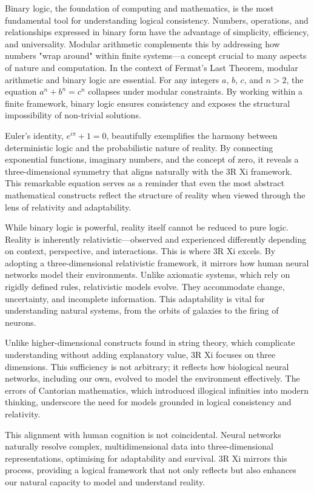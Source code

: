 \documentclass[12pt]{article}
\begin{document}
Binary logic, the foundation of computing and mathematics, is the most fundamental tool for understanding logical consistency. Numbers, operations, and relationships expressed in binary form have the advantage of simplicity, efficiency, and universality. Modular arithmetic complements this by addressing how numbers "wrap around" within finite systems—a concept crucial to many aspects of nature and computation. In the context of Fermat’s Last Theorem, modular arithmetic and binary logic are essential. For any integers \(a\), \(b\), \(c\), and \(n > 2\), the equation \(a^n + b^n = c^n\) collapses under modular constraints. By working within a finite framework, binary logic ensures consistency and exposes the structural impossibility of non-trivial solutions.

Euler’s identity, \(e^{i\pi} + 1 = 0\), beautifully exemplifies the harmony between deterministic logic and the probabilistic nature of reality. By connecting exponential functions, imaginary numbers, and the concept of zero, it reveals a three-dimensional symmetry that aligns naturally with the 3R Xi framework. This remarkable equation serves as a reminder that even the most abstract mathematical constructs reflect the structure of reality when viewed through the lens of relativity and adaptability.

While binary logic is powerful, reality itself cannot be reduced to pure logic. Reality is inherently relativistic—observed and experienced differently depending on context, perspective, and interactions. This is where 3R Xi excels. By adopting a three-dimensional relativistic framework, it mirrors how human neural networks model their environments. Unlike axiomatic systems, which rely on rigidly defined rules, relativistic models evolve. They accommodate change, uncertainty, and incomplete information. This adaptability is vital for understanding natural systems, from the orbits of galaxies to the firing of neurons.

Unlike higher-dimensional constructs found in string theory, which complicate understanding without adding explanatory value, 3R Xi focuses on three dimensions. This sufficiency is not arbitrary; it reflects how biological neural networks, including our own, evolved to model the environment effectively. The errors of Cantorian mathematics, which introduced illogical infinities into modern thinking, underscore the need for models grounded in logical consistency and relativity.

This alignment with human cognition is not coincidental. Neural networks naturally resolve complex, multidimensional data into three-dimensional representations, optimising for adaptability and survival. 3R Xi mirrors this process, providing a logical framework that not only reflects but also enhances our natural capacity to model and understand reality.
\end{document}
